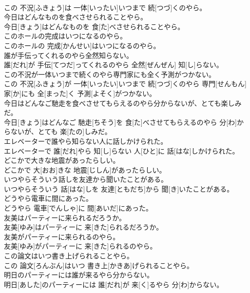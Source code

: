 \documentclass[8pt]{extreport}
\begin{document}
\begin{CJK}{UTF8}{min}
\\	この 不況[ふきょう]は 一体[いったい]いつまで 続[つづ]くのやら。
\\	今日はどんなものを食べさせられることやら。	
\\	今日[きょう]はどんなものを 食[た]べさせられることやら。
\\	このホールの完成はいつになるのやら。	
\\	このホールの 完成[かんせい]はいつになるのやら。
\\	誰が手伝ってくれるのやら全然知らない。	
\\	誰[だれ]が 手伝[てつだ]ってくれるのやら 全然[ぜんぜん] 知[し]らない。
\\	この不況が一体いつまで続くのやら専門家にも全く予測がつかない。	
\\	この 不況[ふきょう]が 一体[いったい]いつまで 続[つづ]くのやら 専門[せんもん] 家[か]にも 全[まった]く 予測[よそく]がつかない。
\\	今日はどんなご馳走を食べさせてもらえるのやら分からないが、とても楽しみだ。	
\\	今日[きょう]はどんなご 馳走[ちそう]を 食[た]べさせてもらえるのやら 分[わ]からないが、とても 楽[たの]しみだ。
\\	エレベーターで誰やら知らない人に話しかけられた。	
\\	エレベーターで 誰[だれ]やら 知[し]らない 人[ひと]に 話[はな]しかけられた。
\\	どこかで大きな地震があったらしい。	
\\	どこかで 大[おお]きな 地震[じしん]があったらしい。
\\	いつやらそういう話しを友達から聞いたことがある。	
\\	いつやらそういう 話[はな]しを 友達[ともだち]から 聞[き]いたことがある。
\\	どうやら電車に間にあった。	
\\	どうやら 電車[でんしゃ]に 間[あいだ]にあった。
\\	友美はパーティーに来られるだろうか。	
\\	友美[ゆみ]はパーティーに 来[きた]られるだろうか。
\\	友美がパーティーに来られるのやら。	
\\	友美[ゆみ]がパーティーに 来[きた]られるのやら。
\\	この論文はいつ書き上げられることやら。	
\\	この 論文[ろんぶん]はいつ 書き上[かきあ]げられることやら。
\\	明日のパーティーには誰が来るやら分からない。	
\\	明日[あした]のパーティーには 誰[だれ]が 来[く]るやら 分[わ]からない。

\end{CJK}
\end{document}
